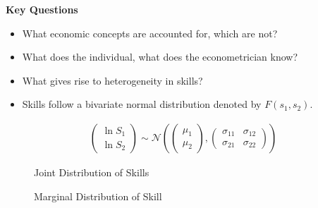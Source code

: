 \begin{frame}
\textbf{Key Questions}\\
\begin{itemize}\setlength\itemsep{1em}
\item What economic concepts are accounted for, which are not?
\item What does the individual, what does the econometrician know?
\item What gives rise to heterogeneity in skills?
\end{itemize}
\end{frame}


\begin{frame}
\begin{itemize}
\item Skills follow a bivariate normal distribution denoted by $F(s_1, s_2)$.
\end{itemize}

\begin{align*}
\begin{pmatrix}
 \ln S_1 \\
 \ln S_2
\end{pmatrix}  \sim \mathcal{N} \left( \begin{pmatrix}
 \mu_1 \\
 \mu_2
\end{pmatrix} , \begin{pmatrix}
 \sigma_{11}  &  \sigma_{12} \\
 \sigma_{21}&  \sigma_{22}
\end{pmatrix} \right)
\end{align*}

\end{frame}

\begin{frame}
\begin{figure}[htp]\centering
\caption{Joint Distribution of Skills}\label{Joint Distribution of Skills}
\end{figure}
\end{frame}

\begin{frame}
\begin{figure}[htp]\centering
\caption{Marginal Distribution of Skill}\label{Marginal Distribution of Skill}
\end{figure}
\end{frame}


